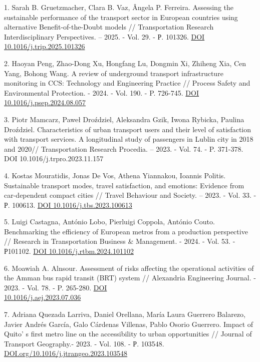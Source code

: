 \begin{references}
1. Sarah B. Gruetzmacher, Clara B. Vaz, Ângela P. Ferreira. Assessing the
sustainable performance of the transport sector in European countries
using alternative Benefit-of-the-Doubt models // Transportation
Research Interdisciplinary Perspectives. -- 2025. - Vol. 29. - Р.
101326. \href{https://doi.org/10.1016/j.trip.2025.101326}{DOI
10.1016/j.trip.2025.101326}

2. Haoyan Peng, Zhao-Dong Xu, Hongfang Lu, Dongmin Xi, Zhiheng Xia, Cen
Yang, Bohong Wang. A review of underground transport infrastructure
monitoring in CCS: Technology and Engineering Practice // Process
Safety and Environmental Protection. - 2024. - Vol. 190. - P. 726-745.
\href{https://doi.org/10.1016/j.psep.2024.08.057}{DOI\\
10.1016/j.psep.2024.08.057}

3. Piotr Mamcarz, Paweł Droździel, Aleksandra Gzik, Iwona Rybicka,
Paulina Droździel. Characteristics of urban transport users and their
level of satisfaction with transport services. A longitudinal study of
passengers in Lublin city in 2018 and 2020// Transportation Research
Procedia. -- 2023. - Vol. 74. - P. 371-378. DOI
10.1016/j.trpro.2023.11.157

4. Kostas Mouratidis, Jonas De Vos, Athena Yiannakou, Ioannis Politis.
Sustainable transport modes, travel satisfaction, and emotions:
Evidence from car-dependent compact cities // Travel Behaviour and
Society. -- 2023. - Vol. 33. - Р. 100613.
\href{https://doi.org/10.1016/j.tbs.2023.100613}{DOI
10.1016/j.tbs.2023.100613}

5. Luigi Castagna, António Lobo, Pierluigi Coppola, António Couto.
Benchmarking the efficiency of European metros from a production
perspective // Research in Transportation Business \& Management. -
2024. - Vol. 53. - Р101102.
\href{https://doi.org/10.1016/j.rtbm.2024.101102}{DOI
10.1016/j.rtbm.2024.101102}

6. Moawiah A. Alnsour. Assessment of risks affecting the operational
activities of the Amman bus rapid transit (BRT) system // Alexandria
Engineering Journal. - 2023. - Vol. 78. - P. 265-280.
\href{https://doi.org/10.1016/j.aej.2023.07.036}{DOI\\
10.1016/j.aej.2023.07.036}

7. Adriana Quezada Larriva, Daniel Orellana, María Laura Guerrero
Balarezo, Javier Andrés García, Galo Cárdenas Villenas, Pablo Osorio
Guerrero. Impact of Quito' s first metro line on the
accessibility to urban opportunities // Journal of Transport
Geography.- 2023. - Vol. 108. - Р. 103548.\\
\href{https://doi.org/10.1016/j.jtrangeo.2023.103548}{DOI.org/10.1016/j.jtrangeo.2023.103548}


\end{references}
